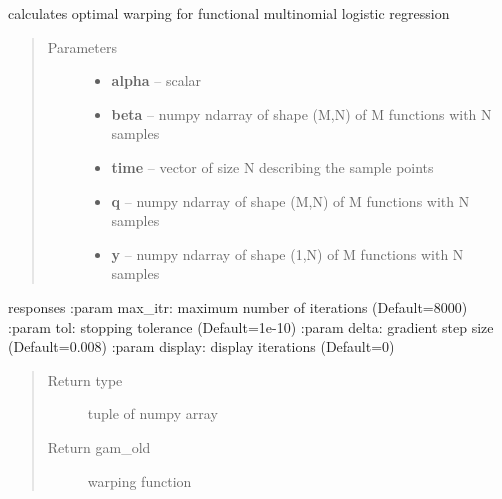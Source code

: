 \documentclass[letterpaper,10pt,english]{sphinxmanual}
\begin{document}
\begin{fulllineitems}
\label{regression:regression.mlogit_warp_grad}
calculates optimal warping for functional multinomial logistic regression
\begin{quote}\begin{description}
\item[{Parameters}] \leavevmode\begin{itemize}
\item {} 
\textbf{alpha} -- scalar

\item {} 
\textbf{beta} -- numpy ndarray of shape (M,N) of M functions with N samples

\item {} 
\textbf{time} -- vector of size N describing the sample points

\item {} 
\textbf{q} -- numpy ndarray of shape (M,N) of M functions with N samples

\item {} 
\textbf{y} -- numpy ndarray of shape (1,N) of M functions with N samples

\end{itemize}

\end{description}\end{quote}

responses
:param max\_itr: maximum number of iterations (Default=8000)
:param tol: stopping tolerance (Default=1e-10)
:param delta: gradient step size (Default=0.008)
:param display: display iterations (Default=0)
\begin{quote}\begin{description}
\item[{Return type}] \leavevmode
tuple of numpy array

\item[{Return gam\_old}] \leavevmode
warping function

\end{description}\end{quote}

\end{fulllineitems}

\end{document}
